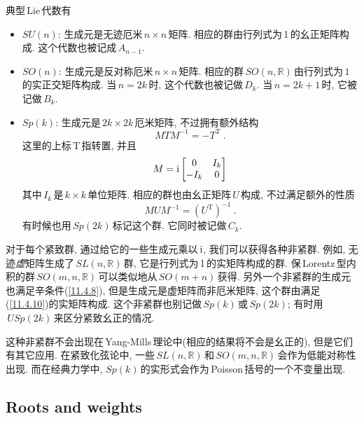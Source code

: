典型\,Lie\,代数有
\begin{itemize}
    \item $SU(n)$: 生成元是无迹厄米$\,n\times n\,$矩阵. 相应的群由行列式为\,1\,的幺正矩阵构成. 这个代数也被记成$\,A_{n-1}$.
    \item $SO(n)$: 生成元是反对称厄米$\,n\times n\,$矩阵. 相应的群$\,SO(n,\mathds{R})\,$由行列式为$\,1\,$的实正交矩阵构成. 当$\,n=2k\,$时, 这个代数也被记做$\,D_{k}$. 当$\,n=2k+1\,$时, 它被记做$\,B_{k}$.
    \item $Sp(k)$: 生成元是$\,2k\times 2k\,$厄米矩阵, 不过拥有额外结构
    \begin{equation}
        M T M^{-1} = - T^{\mathrm{T}} \:. \label{11.4.8}
    \end{equation}
    这里的上标$\,\mathrm{T}\,$指转置, 并且
    \begin{equation}
        M = \mathrm{i} \begin{bmatrix}
        0 & I_{k} \\ -I_{k} & 0 
        \end{bmatrix} \label{11.4.9}
    \end{equation}
    其中$\,I_{k}\,$是$\,k\times k\,$单位矩阵. 相应的群也由幺正矩阵$\,U\,$构成, 不过满足额外的性质
    \begin{equation}
        M U M^{-1} = (U^{\mathrm{T}})^{-1} \:. \label{11.4.10}
    \end{equation}
    有时候也用$\,Sp(2k)\,$标记这个群. 它同时被记做$\,C_{k}$.
\end{itemize}

对于每个紧致群, 通过给它的一些生成元乘以$\,\mathrm{i}$, 我们可以获得各种非紧群. 例如, 无迹{\emph{虚}}矩阵生成了$\,SL(n,\mathds{R})\,$群, 它是行列式为\,1\,的实矩阵构成的群. 保\,Lorentz\,型内积的群$\,SO(m,n,\mathds{R})\,$可以类似地从$\,SO(m+n)\,$获得. 另外一个非紧群的生成元也满足辛条件(\ref{11.4.8}), 但是生成元是虚矩阵而非厄米矩阵, 这个群由满足(\ref{11.4.10})的实矩阵构成. 这个非紧群也别记做$\,Sp(k)\,$或$\,Sp(2k)$; 有时用$\,USp(2k)\,$来区分紧致幺正的情况.

这种非紧群不会出现在\,Yang-Mills\,理论中(相应的结果将不会是幺正的), 但是它们有其它应用. 在紧致化弦论中, 一些$\,SL(n,\mathds{R})\,$和$\,SO(m,n,\mathds{R})\,$会作为低能对称性出现. 而在经典力学中, $Sp(k)\,$的实形式会作为\,Poisson\,括号的一个不变量出现.

\subsection*{Roots and weights}


